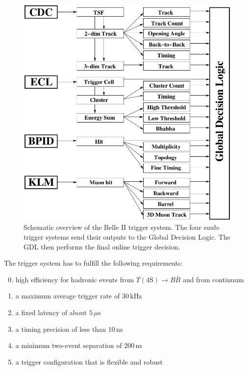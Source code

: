 \documentclass[a4paper,11pt,twosided,final,german,openbib,pdftex,listof=totoc,bibliography=totoc]{scrbook}
\begin{document}
\begin{figure}[h!]
	\centering
	\includegraphics[width=12cm]{Bilder/Trigger}
	\caption[Schematic Overview Of The Trigger System]{Schematic overview of the Belle II trigger system. The four suub-trigger systems send their outputs to the Global Decision Logic. The GDL then performs the final online trigger decision. \cite{LumiTrigger}}
	\label{fig:Trigger}
\end{figure}




The trigger system has to fulfill the following requirements:\cite{B2TR}

\begin{enumerate}
	\setcounter{enumi}{-1}
	\item high efficiency for hadronic events from $\Upsilon(4\textrm{S}) \rightarrow B\bar{B}$ and from continuum
	\item a maximum average trigger rate of $30\,\textrm{kHz}$
	\item a fixed latency of about $5\,\mu \textrm{s}$
	\item a timing precision of less than $10\,\textrm{ns}$
	\item a minimum two-event separation of $200\,\textrm{ns}$
	\item a trigger configuration that is flexible and robust
\end{enumerate}
\end{document}
